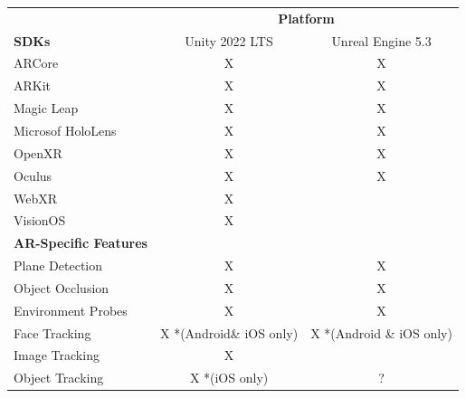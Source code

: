 \documentclass{vgtc}                          %
\begin{document}
\begin{table}
	\centering

	\begin{tabular}{l c c}
		\toprule
		                              & \multicolumn{2}{c}{\textbf{Platform}}                            \\
		\cmidrule(l){2-3}
		\textbf{SDKs}                 & Unity 2022 LTS                        & Unreal Engine 5.3        \\
		\midrule
		ARCore                        & X                                     & X                        \\
		ARKit                         & X                                     & X                        \\
		Magic Leap                    & X                                     & X                        \\
		Microsof HoloLens             & X                                     & X                        \\
		OpenXR                        & X                                     & X                        \\
		Oculus                        & X                                     & X                        \\
		WebXR                         & X                                     &                          \\
		VisionOS                      & X                                     &                          \\
		\midrule
		\textbf{AR-Specific Features} &                                       &                          \\
		\midrule
		Plane Detection               & X                                     & X                        \\
		Object Occlusion              & X                                     & X                        \\
		Environment Probes            & X                                     & X                        \\
		Face Tracking                 & X *(Android\& iOS only)               & X *(Android \& iOS only) \\
		Image Tracking                & X                                     &                          \\
		Object Tracking               & X *(iOS only)                         & ?                        \\

\end{tabular}
\end{table}
\end{document}
